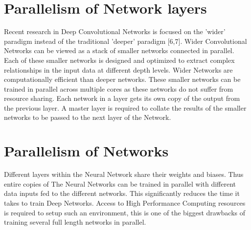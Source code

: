 \documentclass[sigconf]{acmart}
\begin{document}
\section{Parallelism of Network layers}

Recent research in Deep Convolutional Networks is focused on the 'wider' paradigm instead of the traditional 'deeper' paradigm [6,7]. Wider Convolutional Networks can be viewed as a stack of smaller networks connected in parallel. Each of these smaller networks is designed and optimized to extract complex relationships in the input data at different depth levels. Wider Networks are computationally efficient than deeper networks. These smaller networks can be trained in parallel across multiple cores as these networks do not suffer from resource sharing. Each network in a layer gets its own copy of the output from the previous layer. A master layer is required to collate the results of the smaller networks to be passed to the next layer of the Network. 

\section{Parallelism of Networks}


Different layers within the Neural Network share their weights and biases. Thus entire copies of The Neural Networks can be trained in parallel with different data inputs fed to the different networks. This significantly reduces the time it takes to train Deep Networks. Access to High Performance Computing resources is required to setup such an environment, this is one of the biggest drawbacks of training several full length networks in parallel.



 
\end{document}
